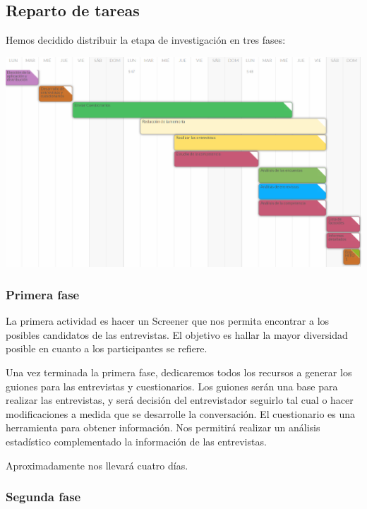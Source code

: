 \documentclass[12pt]{article}
\begin{document}
\subsection{Reparto de tareas}

Hemos decidido distribuir la etapa de investigación en tres fases:

\begin{center}
	\includegraphics[width=1\textwidth]{images/planificacionHito1.png}
\end{center}

\subsubsection*{Primera fase}

La primera actividad es hacer un Screener que nos permita encontrar a los posibles candidatos de las entrevistas. El objetivo es hallar la mayor diversidad posible en cuanto a los participantes se refiere.

	Una vez terminada la primera fase, dedicaremos todos los recursos a generar los guiones para las entrevistas y cuestionarios. Los guiones serán una base para realizar las entrevistas, y será decisión del entrevistador seguirlo tal cual o hacer modificaciones a medida que se desarrolle la conversación. El cuestionario es una herramienta para obtener información. Nos permitirá realizar un análisis estadístico complementado la información de las entrevistas. 

Aproximadamente nos llevará cuatro días.

\subsubsection*{Segunda fase}
\end{document}
